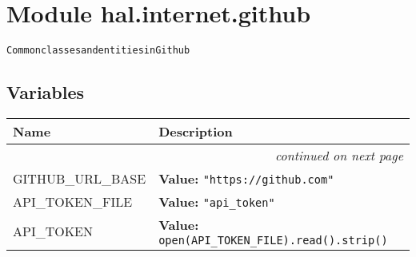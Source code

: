 %
%
%


\section{Module hal.internet.github}

    \label{hal:internet:github}
\begin{alltt}
Common classes and entities in Github 
\end{alltt}



  \subsection{Variables}

    \vspace{-1cm}
\hspace{\varindent}\begin{longtable}{|p{\varnamewidth}|p{\vardescrwidth}|l}
\cline{1-2}
\cline{1-2} \centering \textbf{Name} & \centering \textbf{Description}& \\
\cline{1-2}
\endhead\cline{1-2}\multicolumn{3}{r}{\small\textit{continued on next page}}\\\endfoot\cline{1-2}
\endlastfoot\raggedright G\-I\-T\-H\-U\-B\-\_\-U\-R\-L\-\_\-B\-A\-S\-E\- & \raggedright \textbf{Value:} 
{\tt "https://github.com"}&\\
\cline{1-2}
\raggedright A\-P\-I\-\_\-T\-O\-K\-E\-N\-\_\-F\-I\-L\-E\- & \raggedright \textbf{Value:} 
{\tt "api\_token"}&\\
\cline{1-2}
\raggedright A\-P\-I\-\_\-T\-O\-K\-E\-N\- & \raggedright \textbf{Value:} 
{\tt open(API\_TOKEN\_FILE).read().strip()}&\\
\cline{1-2}
\end{longtable}


